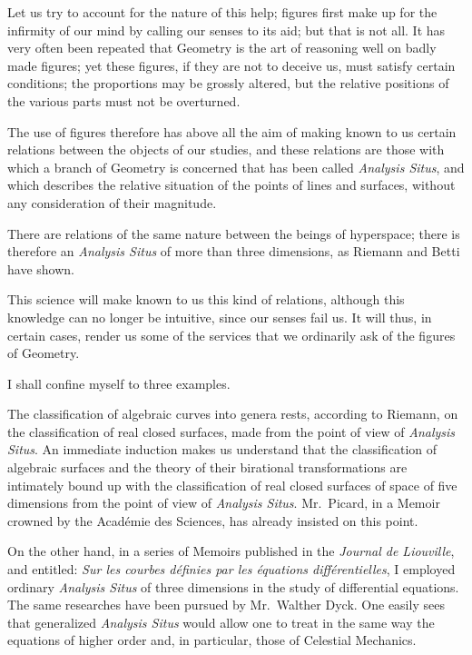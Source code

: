 \documentclass{article}
\begin{document}
Let us try to account for the nature of this help; figures first make up for the infirmity of our mind by calling our senses to its aid; but that is not all. It has very often been repeated that Geometry is the art of reasoning well on badly made figures; yet these figures, if they are not to deceive us, must satisfy certain conditions; the proportions may be grossly altered, but the relative positions of the various parts must not be overturned.

The use of figures therefore has above all the aim of making known to us certain relations between the objects of our studies, and these relations are those with which a branch of Geometry is concerned that has been called \emph{Analysis Situs}, and which describes the relative situation of the points of lines and surfaces, without any consideration of their magnitude.

There are relations of the same nature between the beings of hyperspace; there is therefore an \emph{Analysis Situs} of more than three dimensions, as Riemann and Betti have shown.

This science will make known to us this kind of relations, although this knowledge can no longer be intuitive, since our senses fail
us. It will thus, in certain cases, render us some of the services that we ordinarily ask of the figures of Geometry.

I shall confine myself to three examples.

The classification of algebraic curves into genera rests, according to Riemann, on the classification of real closed surfaces, made from the point of view of \emph{Analysis Situs}. An immediate induction makes us understand that the classification of algebraic surfaces and the theory of their birational transformations are intimately bound up with the classification of real closed surfaces of space of five dimensions from the point of view of \emph{Analysis Situs}. Mr.~Picard, in a Memoir crowned by the Académie des Sciences, has already insisted on this point.

On the other hand, in a series of Memoirs published in the \emph{Journal de Liouville}, and entitled: \emph{Sur les courbes définies par les équations différentielles}, I employed ordinary \emph{Analysis Situs} of three dimensions in the study of differential equations. The same researches have been pursued by Mr.~Walther Dyck. One easily sees that generalized \emph{Analysis Situs} would allow one to treat in the same way the equations of higher order and, in particular, those of Celestial Mechanics.
\end{document}
